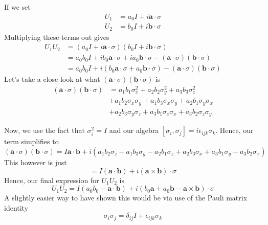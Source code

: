 If we set 
\begin{align*}
U_1 &=  a_0 I + i \mathbf{ a} \cdot  \sigma  \\
U_2 &=  b_0 I + i \mathbf{ b} \cdot  \sigma  
\end{align*}
Multiplying these terms out gives
\begin{align*}
U_1 U_2 & = (a_0 I + i \mathbf{ a} \cdot  \sigma )( b_0 I + i \mathbf{b} \cdot \sigma ) \\
&=  a_0 b_0 I + i b_0 \mathbf{ a} \cdot  \sigma + i a_0 \mathbf{ b } \cdot  \sigma - ( \mathbf{ a} \cdot \sigma) ( \mathbf{ b } \cdot  \sigma )  \\
&= a_0 b_0 I + i (b_0 \mathbf{ a} \cdot  \sigma + a_ 0 \mathbf{ b } \cdot  \sigma ) - ( \mathbf{ a} \cdot  \sigma) ( \mathbf{ b } \cdot  \sigma )  
\end{align*}
Let's take a close look at what $ ( \mathbf { a} \cdot  \sigma ) ( \mathbf{ b } \cdot  \sigma) $ is
\begin{align*}
( \mathbf{ a} \cdot  \sigma ) ( \mathbf{ b } \cdot  \sigma ) &=  a_1 b_1 \sigma_x ^ 2 + a_2 b_2 \sigma_ y ^ 2 + a_3 b_3 \sigma_ z ^ 2  \\
				     & +   a_1b_2 \sigma_ x \sigma _ y + a_1 b_3 \sigma_ x \sigma _ y + a_2 b_1 \sigma_ y \sigma _ x  \\
& +   a_2 b_3 \sigma _ y \sigma _ z + a_3 b_1 \sigma_ z \sigma _ x + a_3 b_2 \sigma_ z \sigma_ y  
\end{align*} 

Now, we use the fact that $ \sigma_i^ 2 = I$ and our algebra $ [ \sigma_ i , \sigma _ j ] = i \epsilon_{ i j k } \sigma_ k $. 
Hence, our term simplifies to 
\[
( \mathbf{ a} \cdot  \sigma )(  \mathbf { b } \cdot  \sigma) =  I \mathbf{ a} \cdot  \mathbf{ b }  + i ( a_1 b_2 \sigma_ z - a_1 b_3 \sigma_ y - a_2 b_1 \sigma_ z+ a_2 b_3 \sigma_ x + a_3 b_1 \sigma_ y - a_3 b_2 \sigma_ x )  
\] This however is just 
\[
= I ( \mathbf{ a} \cdot  \mathbf{ b } ) + i ( \mathbf{ a} \times \mathbf{ b } ) \cdot  \sigma 
\] Hence, our final expression for $ U_1 U_2 $ is 
\[
U_1 U_2 = I ( a_0 b_0 - \mathbf{ a} \cdot  \mathbf{ b } ) + i ( b_0 \mathbf{ a} + a_0 \mathbf{ b } - \mathbf{ a} \times \mathbf{ b } ) \cdot  \sigma
\] 
A slightly easier way to have shown 
this would be via use of the Pauli matrix 
identity 
\[
\sigma_ i \sigma_ j = \delta_{ ij } I + \epsilon_{ i j k} \sigma_ k 
\]  
\pagebreak 
